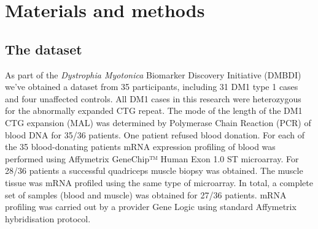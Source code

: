 \documentclass[10pt,letterpaper]{article}
\begin{document}








\section*{Materials and methods}
\subsection*{The dataset} \label{the_dataset}
As part of the {\it Dystrophia Myotonica} Biomarker Discovery Initiative (DMBDI) we've obtained a dataset from 35 participants, including 31 DM1 type 1 cases and four unaffected controls. All DM1 cases in this research were heterozygous for the abnormally expanded CTG repeat. The mode of the length of the DM1 CTG expansion (MAL) was determined by Polymerase Chain Reaction (PCR) of blood DNA for 35/36 patients. One patient refused blood donation. For each of the 35 blood-donating patients mRNA expression profiling of blood was performed using Affymetrix GeneChip™ Human Exon 1.0 ST microarray. For 28/36 patients a successful quadriceps muscle biopsy was obtained. The muscle tissue was mRNA profiled using the same type of microarray. In total, a complete set of samples (blood and muscle) was obtained for 27/36 patients. mRNA profiling was carried out by a provider Gene Logic using standard Affymetrix hybridisation protocol.
\end{document}
